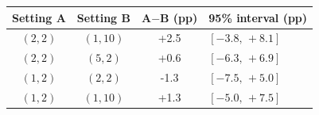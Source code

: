 \begin{tabular}{@{}ccS[table-format=+2.1]l@{}}
\toprule
Setting A & Setting B & {A$-$B (pp)} & 95\% interval (pp)\\
\midrule
$(2,2)$ & $(1,10)$ & +2.5 & $[-3.8,\,+8.1]$\\
$(2,2)$ & $(5,2)$ & +0.6 & $[-6.3,\,+6.9]$\\
$(1,2)$ & $(2,2)$ & -1.3 & $[-7.5,\,+5.0]$\\
$(1,2)$ & $(1,10)$ & +1.3 & $[-5.0,\,+7.5]$\\
\bottomrule
\end{tabular}
